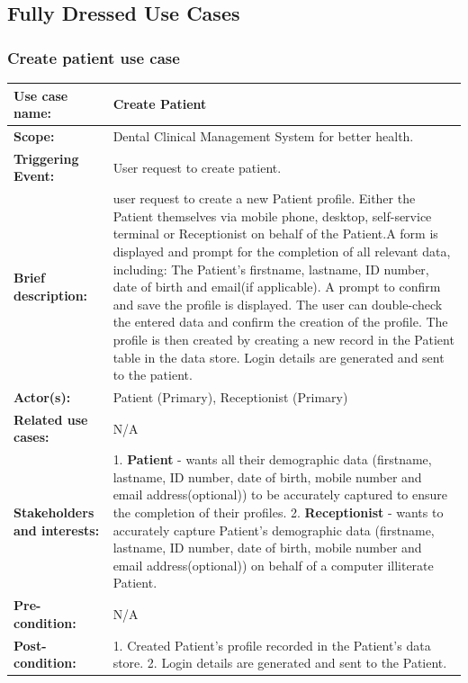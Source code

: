 \documentclass[11 pt]{article}
\begin{document}
\subsection{Fully Dressed Use Cases}
\subsubsection{Create patient use case}

\begin{tabular}{|p{3cm}|p{9cm}|}
\hline
\textbf{Use case name:}& Create Patient\\
\hline
\textbf{Scope:}& Dental Clinical Management System for better health.\\
\hline
\textbf{Triggering Event:}& User request to create patient.\\
\hline
\textbf{Brief description:}& user request to create a new Patient profile. Either the Patient themselves via mobile phone, desktop, self-service terminal or Receptionist on behalf of the Patient.A form is displayed and prompt for the completion of all relevant data, including: The Patient's firstname, lastname, ID number, date of birth and email(if applicable). A prompt to confirm and save the profile is displayed. The user can double-check the entered data and confirm the creation of the profile. The profile is then created by creating a new record in the Patient table in the data store. Login details are generated and sent to the patient.\\
\hline
\textbf{Actor(s):}& Patient (Primary), Receptionist (Primary)\\
\hline
\textbf{Related use cases:}& N/A\\
\hline
\textbf{Stakeholders and interests:}& 1. \textbf{Patient} - wants all their demographic data (firstname, lastname, ID number, date of birth, mobile number and email address(optional)) to be accurately captured to ensure the completion of their profiles. 2. \textbf{Receptionist} - wants to accurately capture Patient's demographic data (firstname, lastname, ID number, date of birth, mobile number and email address(optional)) on behalf of a computer illiterate Patient.\\
\hline
\textbf{Pre-condition:}& N/A\\
\hline
\textbf{Post-condition:}& 1. Created Patient's profile recorded in the Patient's data store. 2. Login details are generated and sent to the Patient.\\
\hline
\end{tabular}
\end{document}
